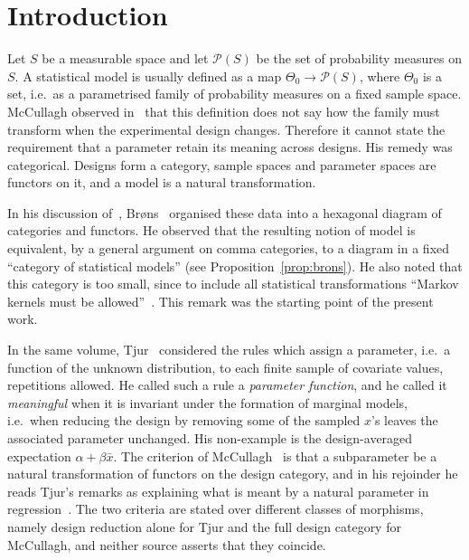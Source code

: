 \documentclass[11pt,a4paper]{article}
\theoremstyle{plain}
\theoremstyle{definition}
\theoremstyle{remark}
\newcommand{\Prb}{\mathcal{P}}
\begin{document}
\setcounter{tocdepth}{2}
\tableofcontents

\section{Introduction}\label{sec:intro}

Let $S$ be a measurable space and let $\Prb(S)$ be the set of probability
measures on $S$. A statistical model is usually defined as a map
$\Theta_0 \to \Prb(S)$, where $\Theta_0$ is a set, i.e.\ as a parametrised
family of probability measures on a fixed sample space. McCullagh observed
in~\cite{mccullagh_what_2002} that this definition does not say how the family
must transform when the experimental design changes. Therefore it cannot state
the requirement that a parameter retain its meaning across designs. His remedy
was categorical. Designs form a category, sample spaces and parameter spaces
are functors on it, and a model is a natural transformation.

In his discussion of~\cite{mccullagh_what_2002},
Br\o ns~\cite[pp.~1280--1282]{brons_discussion_2002} organised these data into
a hexagonal diagram of categories and functors. He observed that the resulting
notion of model is equivalent, by a general argument on comma categories, to a
diagram in a fixed ``category of statistical models'' (see
Proposition~\ref{prop:brons}). He also noted that this category is too small,
since to include all statistical transformations ``Markov kernels must be
allowed''~\cite[p.~1282]{brons_discussion_2002}. This remark was the starting
point of the present work.

In the same volume, Tjur~\cite{tjur_discussion_2002} considered the rules which
assign a parameter, i.e.\ a function of the unknown distribution, to each
finite sample of covariate values, repetitions allowed. He called such a rule
a \emph{parameter function}, and he called it \emph{meaningful} when it is
invariant under the formation of marginal models, i.e.\ when reducing the
design by removing some of the sampled $x$'s leaves the associated parameter
unchanged. His non-example is the design-averaged expectation
$\alpha + \beta\bar x$. The criterion of
McCullagh~\cite[\S4.5]{mccullagh_what_2002} is that a subparameter be a natural
transformation of functors on the design category, and in his rejoinder he
reads Tjur's remarks as explaining what is meant by a natural parameter in
regression~\cite[p.~1304]{mccullagh_what_2002}. The two criteria are stated
over different classes of morphisms, namely design reduction alone for Tjur
and the full design category for McCullagh, and neither source asserts that
they coincide.
\end{document}
